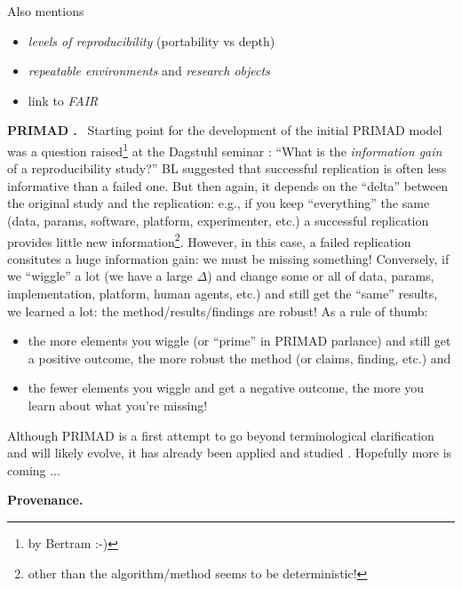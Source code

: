 \documentclass[sigconf,screen,nonacm]{acmart}
\newcommand{\mypara}[1]{\vspace{6pt}\noindent\textbf{#1}~}
\begin{document}
Also mentions 
\begin{itemize}
\item \emph{levels of reproducibility} (portability vs depth)
\item \emph{repeatable environments} and \emph{research objects }
\item link to \emph{FAIR}
\end{itemize}

\mypara{PRIMAD \cite {rauber16primad}.} Starting point for the
development of the initial PRIMAD model \cite {rauber16primad} was a
question raised\footnote{by Bertram :-)} at the Dagstuhl seminar
\cite{freire2016reproducibilitya}: ``What is the \emph{information
  gain} of a reproducibility study?'' BL suggested that successful
replication is often less informative than a failed one.  But then
again, it depends on the ``delta'' between the original study and the
replication: e.g., if you keep ``everything'' the same (data, params,
software, platform, experimenter, etc.) a successful replication
provides little new information\footnote{other than the
  algorithm/method seems to be deterministic!}. However, in this case,
a failed replication consitutes a huge information gain: we must be
missing something! Conversely, if we ``wiggle'' a lot (we have a large
$\Delta$) and change some or all of data, params, implementation,
platform, human agents, etc.)  and still get the ``same'' results, we
learned a lot: the method/results/findings are robust! As a rule of
thumb:
\begin{itemize}
\item the more elements you wiggle (or ``prime'' in PRIMAD parlance)
  and still get a positive outcome, the more robust the method (or
  claims, finding, etc.) and
\item  the fewer elements you wiggle and get a
negative outcome, the more you learn about what you're missing!
\end{itemize}


\noindent Although PRIMAD is a first attempt to go beyond
terminological clarification and will likely evolve, it has already
been applied and studied
\cite{ferro2016increasing,gryk2017workflows,chapp2019applicability}. Hopefully
more is coming ...


\mypara{Provenance.} \cite{pimentel2019survey} 
\end{document}
